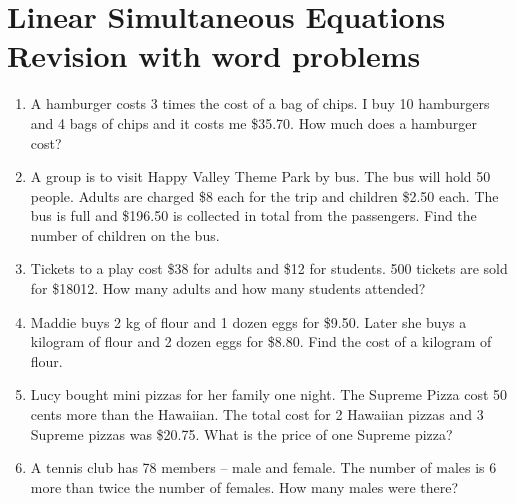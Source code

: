\documentclass[a4paper,11pt]{article}
\begin{document}
\section{Linear Simultaneous Equations Revision with word problems}
\begin{enumerate}
\item A hamburger costs 3 times the cost of a bag of chips. 
I buy 10 hamburgers and 4 bags of chips and it costs me \$35.70. How much does a hamburger cost?
\item A group is to visit Happy Valley Theme Park by bus. The bus will hold 50 people. 
Adults are charged \$8 each for the trip and children \$2.50 each. The bus is full and \$196.50 is collected in total from the passengers.   Find the number of children on the bus.
\item Tickets to a play cost \$38 for adults and \$12 for students. 
500 tickets are sold for \$18012. 
How many adults and how many students attended?
\item Maddie buys 2 kg of flour and 1 dozen eggs for \$9.50. 
Later she buys a kilogram of flour and 2 dozen eggs for \$8.80.
Find the cost of a kilogram of flour.
\item Lucy bought mini pizzas for her family one night. 
The Supreme Pizza cost 50 cents more than the Hawaiian. 
The total cost for 2 Hawaiian pizzas and 3 Supreme pizzas was \$20.75. 
What is the price of one Supreme pizza?
\item A tennis club has 78 members – male and female. The number of males is 6 more than twice the number of females. How many males were there?
\end{enumerate}
\newpage
\end{document}
